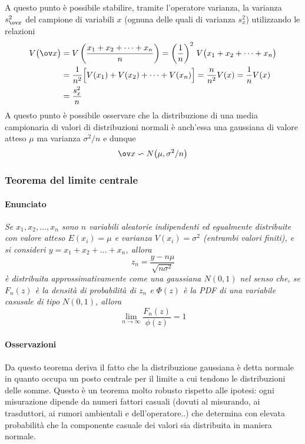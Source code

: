 		A questo punto è possibile stabilire, tramite l'operatore varianza, la varianza $s_{\ov x}^2$ del campione di variabili $x$ (ognuna delle quali di varianza $s_x^2$) utilizzando le relazioni
		\begin{align*}
			V\big(\ov x\big) & = V \left( \frac{x_1 + x_2 + \dots + x_n}{n} \right) = \left(\frac 1 n\right)^2 \, V\big(x_1+x_2+\dots +x_n\big) \\
			& = \frac 1 {n^2} \Big[ V(x_1) + V(x_2) + \dots + V(x_n) \Big] = \frac n {n^2} V(x) = \frac 1 n V(x) \\
			& = \frac{s_x^2}{n}
		\end{align*}	
		A questo punto è possibile osservare che la distribuzione di una media campionaria di valori di distribuzioni normali è anch'essa una gaussiana di valore atteso $\mu$ ma varianza $\sigma^2/n$ e dunque
		\[ \ov x \backsim N\big(\mu , \sigma^2/n\big) \]	
		
		\subsubsection{Teorema del limite centrale}
		\paragraph{Enunciato} {\itshape Se $x_1,x_2,\dots, x_n$ sono $n$ variabili aleatorie indipendenti ed egualmente distribuite con valore atteso $E(x_i)=\mu$ e varianza $V(x_i) = \sigma^2$ (entrambi valori finiti), e si consideri $y = x_1+x_2+\dots + x_n$, allora
		\[ z_n = \frac{y - n\mu }{\sqrt{n\sigma^2}} \]
		è distribuita approssimativamente come una gaussiana $N(0,1)$ nel senso che, se $F_n(z)$ è la densità di probabilità di $z_n$ e $\Phi(z)$ è la PDF di una variabile casusale di tipo $N(0,1)$, allora
		\[\lim_{n\rightarrow \infty} \frac{F_n(z)}{\phi(z)} = 1\] }
		
		\paragraph{Osservazioni} Da questo teorema deriva il fatto che la distribuzione gaussiana è detta normale in quanto occupa un posto centrale per il limite a cui tendono le distribuzioni delle somme. Questo è un teorema molto robusto rispetto alle ipotesi: ogni  misurazione dipende da numeri fattori casuali (dovuti al misurando, ai trasduttori, ai rumori ambientali e dell'operatore..) che determina con elevata probabilità che la componente casuale dei valori sia distribuita in maniera normale.
		
